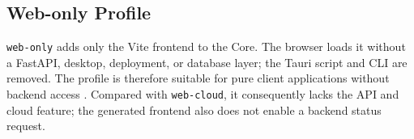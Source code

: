 \subsection{Web-only Profile}
\label{subsec:profil-web-only}

\texttt{web-only} adds only the Vite frontend to the Core. The browser loads
it without a FastAPI, desktop, deployment, or database layer; the Tauri script
and CLI are removed. The profile is therefore suitable for pure client
applications without backend access \parencite{kleiveist2026profiles}.
Compared with \texttt{web-cloud}, it consequently lacks the API and cloud
feature; the generated frontend also does not enable a backend status request.
